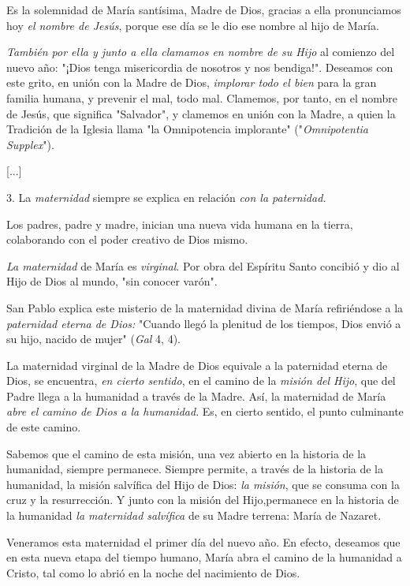 \begin{body}
Es la solemnidad de María santísima, Madre de Dios, gracias a ella
pronunciamos hoy \emph{el nombre de Jesús}, porque ese día se le dio ese
nombre al hijo de María.

\emph{También por ella y junto a ella clamamos en nombre de su Hijo} al
comienzo del nuevo año: "¡Dios tenga misericordia de nosotros y nos
bendiga!". Deseamos con este grito, en unión con la Madre de Dios,
\emph{implorar todo el bien} para la gran familia humana, y prevenir el
mal, todo mal. Clamemos, por tanto, en el nombre de Jesús, que significa
"Salvador", y clamemos en unión con la Madre, a quien la Tradición de la
Iglesia llama "la Omnipotencia implorante" ("\emph{Omnipotentia
	Supplex}").

{[}...{]}

3. La \emph{maternidad} siempre se explica en relación \emph{con la
	paternidad.}

Los padres, padre y madre, inician una nueva vida humana en la tierra,
colaborando con el poder creativo de Dios mismo.

\emph{La maternidad} de María es \emph{virginal}. Por obra del Espíritu
Santo concibió y dio al Hijo de Dios al mundo, "sin conocer varón".

San Pablo explica este misterio de la maternidad divina de María
refiriéndose a la \emph{paternidad eterna de Dios:} "Cuando llegó la
plenitud de los tiempos, Dios envió a su hijo, nacido de mujer"
(\emph{Gal} 4, 4).

La maternidad virginal de la Madre de Dios equivale a la paternidad
eterna de Dios, se encuentra, \emph{en cierto sentido}, en el camino de
la \emph{misión del Hijo}, que del Padre llega a la humanidad a través
de la Madre. Así, la maternidad de María \emph{abre el camino de Dios a
	la humanidad}. Es, en cierto sentido, el punto culminante de este
camino.

Sabemos que el camino de esta misión, una vez abierto en la historia de
la humanidad, siempre permanece. Siempre permite, a través de la
historia de la humanidad, la misión salvífica del Hijo de Dios: \emph{la
	misión}, que se consuma con la cruz y la resurrección. Y junto con la
misión del Hijo,permanece en la historia de la humanidad \emph{la
	maternidad salvífica} de su Madre terrena: María de Nazaret.

Veneramos esta maternidad el primer día del nuevo año. En efecto,
deseamos que en esta nueva etapa del tiempo humano, María abra el camino
de la humanidad a Cristo, tal como lo abrió en la noche del nacimiento
de Dios.


\end{body}
